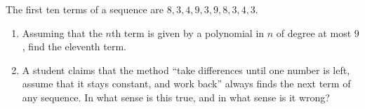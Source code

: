 The first ten terms of a sequence are $8,3,4,9,3,9,8,3,4,3$.
\begin{enumerate}
\item[(a)] Assuming that the $n$th term is given by a polynomial in $n$ of degree at most $9$, find the eleventh term.
\item[(b)] A student claims that the method ``take differences until one number is left, assume that it stays constant, and work back'' always finds the next term of any sequence. In what sense is this true, and in what sense is it wrong?
\end{enumerate}
